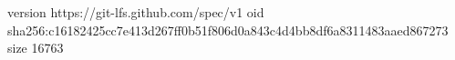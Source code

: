 version https://git-lfs.github.com/spec/v1
oid sha256:c16182425cc7e413d267ff0b51f806d0a843c4d4bb8df6a8311483aaed867273
size 16763
